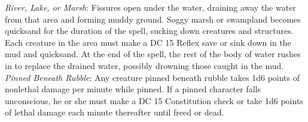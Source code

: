 \textit{River, Lake, or Marsh}: Fissures open under the water, draining away the water from that area and forming muddy ground. Soggy marsh or swampland becomes quicksand for the duration of the spell, sucking down creatures and structures. Each creature in the area must make a DC 15 Reflex save or sink down in the mud and quicksand. At the end of the spell, the rest of the body of water rushes in to replace the drained water, possibly drowning those caught in the mud.\\
\textit{Pinned Beneath Rubble}: Any creature pinned beneath rubble takes 1d6 points of nonlethal damage per minute while pinned. If a pinned character falls unconscious, he or she must make a DC 15 Constitution check or take 1d6 points of lethal damage each minute thereafter until freed or dead.\\
